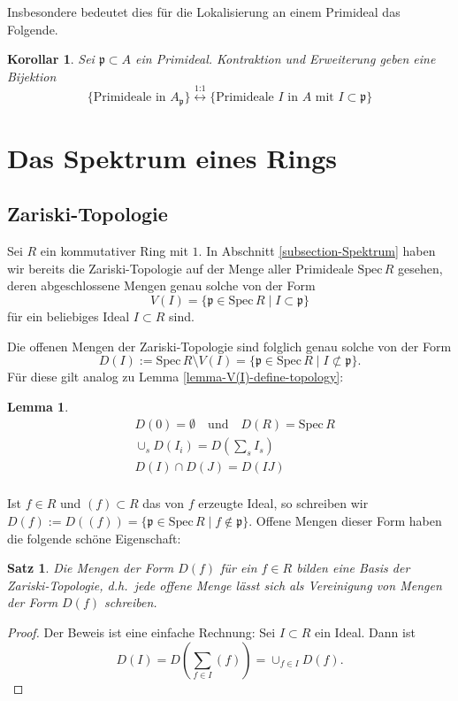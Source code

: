 \documentclass[reqno,12pt]{article}
\numberwithin{equation}{section}
\newcommand{\Spec}{\text{Spec}\,}
\theoremstyle{plain}
\newtheorem{lemma}[thm]{Lemma}
\newtheorem{proposition}[thm]{Satz}
\newtheorem{cor}[thm]{Korollar}
\theoremstyle{definition}
\begin{document}
Insbesondere bedeutet dies für die Lokalisierung an einem Primideal das Folgende.
\begin{cor}
Sei $\mathfrak{p}\subset A$ ein Primideal. Kontraktion und Erweiterung geben eine Bijektion
$$\{\text{Primideale in $A_\mathfrak{p}$}\}\overset{\text{1:1}}{\longleftrightarrow}\{\text{Primideale $I$ in $A$ mit $I\subset \mathfrak{p}$}\}$$
\end{cor}

\newpage

\section{Das Spektrum eines Rings}
\subsection{Zariski-Topologie}

Sei $R$ ein kommutativer Ring mit $1$. In Abschnitt \ref{subsection-Spektrum} haben wir bereits die Zariski-Topologie auf der Menge aller Primideale $\Spec R$ gesehen, deren abgeschlossene Mengen genau solche von der Form
$$V(I)=\{ \mathfrak{p}\in \Spec R\mid I\subset \mathfrak{p} \}$$
für ein beliebiges Ideal $I\subset R$ sind.

Die offenen Mengen der Zariski-Topologie sind folglich genau solche von der Form
$$D(I):=\Spec R\setminus V(I)=\{ \mathfrak{p}\in \Spec R\mid I\not\subset \mathfrak{p} \}.$$
Für diese gilt analog zu Lemma \ref{lemma-V(I)-define-topology}:
\begin{lemma}
\begin{align*}
& D(0) = \emptyset \quad \text{und}\quad D(R) = \Spec R \\
& \cup_s D(I_i)  = D (\sum_s I_s) \\
& D(I) \cap D(J) = D(IJ) \\
\end{align*}
\end{lemma}
Ist $f\in R$ und $(f)\subset R$ das von $f$ erzeugte Ideal, so schreiben wir $D(f):=D((f))=\{ \mathfrak{p}\in \Spec R\mid f\notin \mathfrak{p} \}$. Offene Mengen dieser Form haben die folgende schöne Eigenschaft:
\begin{proposition}
Die Mengen der Form $D(f)$ für ein $f\in R$ bilden eine {\sf Basis} der Zariski-Topologie, d.h.\ jede offene Menge lässt sich als Vereinigung von Mengen der Form $D(f)$ schreiben.
\end{proposition}
\begin{proof}
Der Beweis ist eine einfache Rechnung: Sei $I\subset R$ ein Ideal. Dann ist
$$D(I)=D(\sum_{f\in I}(f))=\cup_{f\in I}D(f).$$
\end{proof}
\end{document}

